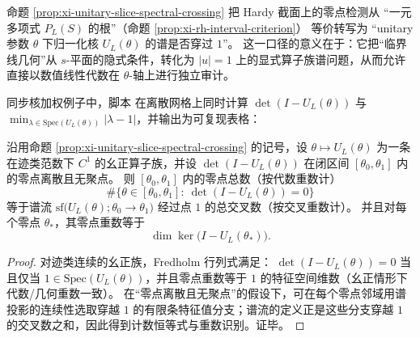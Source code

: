 \begin{remark}\label{rem:xi-unitary-slice-operator-audit}
命题 \ref{prop:xi-unitary-slice-spectral-crossing} 把 Hardy 截面上的零点检测从
“一元多项式 \(P_L(S)\) 的根”（命题 \ref{prop:xi-rh-interval-criterion}）
等价转写为
“unitary 参数 \(\theta\) 下归一化核 \(U_L(\theta)\) 的谱是否穿过 \(1\)”。
这一口径的意义在于：它把“临界线几何”从 \(s\)-平面的隐式条件，转化为 \(|u|=1\) 上的显式算子族谱问题，从而允许直接以数值线性代数在 \(\theta\)-轴上进行独立审计。
\par
同步核加权例子中，脚本  在离散网格上同时计算
\(\det(I-U_L(\theta))\) 与 \(\min_{\lambda\in\mathrm{Spec}(U_L(\theta))}|\lambda-1|\)，并输出为可复现表格：

\end{remark}

\begin{theorem}\label{thm:xi-hardy-slice-spectral-flow-counting}
沿用命题 \ref{prop:xi-unitary-slice-spectral-crossing} 的记号，设 \(\theta\mapsto U_L(\theta)\) 为一条在迹类范数下 \(C^1\) 的幺正算子族，并设 \(\det(I-U_L(\theta))\) 在闭区间 \([\theta_0,\theta_1]\) 内的零点离散且无聚点。
则 \([\theta_0,\theta_1]\) 内的零点总数（按代数重数计）
\[
\#\{\theta\in[\theta_0,\theta_1]:\ \det(I-U_L(\theta))=0\}
\]
等于谱流 \(\mathrm{sf}\bigl(U_L(\theta);\theta_0\to\theta_1\bigr)\) 经过点 \(1\) 的总交叉数（按交叉重数计）。
并且对每个零点 \(\theta_\ast\)，其零点重数等于
\[
\dim\ker\bigl(I-U_L(\theta_\ast)\bigr).
\]
\end{theorem}
\begin{proof}
对迹类连续的幺正族，Fredholm 行列式满足：
\(\det(I-U_L(\theta))=0\) 当且仅当 \(1\in \mathrm{Spec}(U_L(\theta))\)，并且零点重数等于 \(1\) 的特征空间维数（幺正情形下代数/几何重数一致）。
在“零点离散且无聚点”的假设下，可在每个零点邻域用谱投影的连续性选取穿越 \(1\) 的有限条特征值分支；谱流的定义正是这些分支穿越 \(1\) 的交叉数之和，因此得到计数恒等式与重数识别。证毕。
\end{proof}

